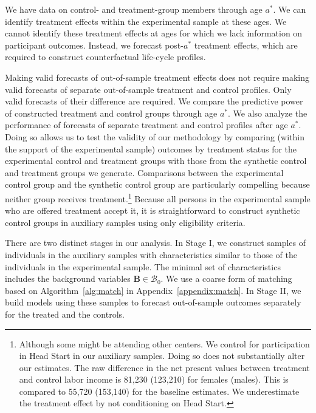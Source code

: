 We have data on control- and treatment-group members through age $a^{\ast}$. We can identify treatment effects within the experimental sample at these ages. We cannot identify these treatment effects at ages for which we lack information on participant outcomes. Instead, we forecast post-$a^{\ast}$ treatment effects, which are required to construct counterfactual life-cycle profiles.

Making valid forecasts of out-of-sample treatment effects does not require making valid forecasts of separate out-of-sample treatment and control profiles. Only valid forecasts of their difference are required. We compare the predictive power of constructed treatment and control groups through age $a^*$. We also analyze the performance of forecasts of separate treatment and control profiles after age $a^*$. Doing so allows us to test the validity of our methodology by comparing (within the support of the experimental sample) outcomes by treatment status for the experimental control and treatment groups with those from the synthetic control and treatment groups we generate. Comparisons between the experimental control group and the synthetic control group are particularly compelling because neither group receives treatment.\footnote{Although some might be attending other centers. We control for participation in Head Start in our auxiliary samples. Doing so does not substantially alter our estimates. The raw difference in the net present values between treatment and control labor income is 81,230 (123,210) for females (males). This is compared to 55,720 (153,140) for the baseline estimates. We underestimate the treatment effect by not conditioning on Head Start.} Because all persons in the experimental sample who are offered treatment accept it, it is straightforward to construct synthetic control groups in auxiliary samples using only eligibility criteria.

There are two distinct stages in our analysis. In Stage I, we construct samples of individuals in the auxiliary samples with characteristics similar to those of the individuals in the experimental sample. The minimal set of characteristics includes the background variables $\bm{B} \in \mathcal{B}_0$. We use a coarse form of matching based on Algorithm~\ref{alg:match} in  Appendix~\ref{appendix:match}. In Stage II, we build models using these samples to forecast out-of-sample outcomes separately for the treated and the controls.

